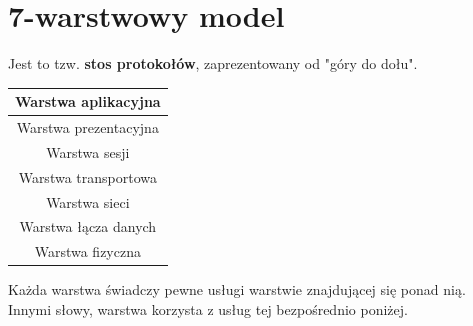 \documentclass[a4paper,twoside]{article}
\begin{document}
\section{7-warstwowy model}
Jest to tzw. \textbf{stos protokołów}, zaprezentowany od "góry do dołu".
\begin{table}[h]
	\begin{tabular}{|c|}
		\hline
		Warstwa aplikacyjna	\\ \hline
		Warstwa prezentacyjna	\\ \hline
		Warstwa sesji		\\ \hline
		Warstwa transportowa		\\ \hline
		Warstwa sieci	\\ \hline
		Warstwa łącza danych		\\ \hline
		Warstwa fizyczna \\ \hline
	\end{tabular}
\end{table}
Każda warstwa świadczy pewne usługi warstwie znajdującej się ponad nią. Innymi słowy, warstwa korzysta z usług tej bezpośrednio poniżej.
\end{document}
